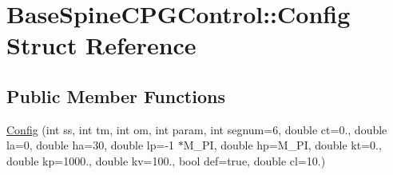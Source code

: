 \hypertarget{struct_base_spine_c_p_g_control_1_1_config}{\section{Base\-Spine\-C\-P\-G\-Control\-:\-:Config Struct Reference}
\label{struct_base_spine_c_p_g_control_1_1_config}
}
\subsection*{Public Member Functions}
\begin{DoxyCompactItemize}
\item 
\hyperlink{struct_base_spine_c_p_g_control_1_1_config_ad43e25ce15e0e29aa2a4749d07887f14}{Config} (int ss, int tm, int om, int param, int segnum=6, double ct=0., double la=0, double ha=30, double lp=-\/1 $\ast$M\-\_\-\-P\-I, double hp=M\-\_\-\-P\-I, double kt=0., double kp=1000., double kv=100., bool def=true, double cl=10.)
\end{DoxyCompactItemize}
